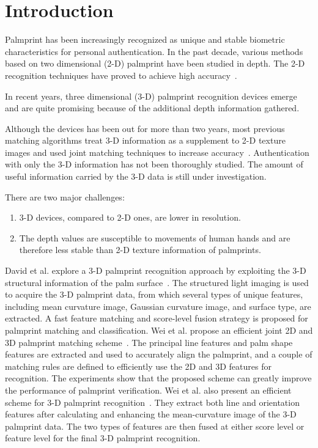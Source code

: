 
\chapter{Introduction\label{ch:intro}}

Palmprint has been increasingly recognized as unique and stable biometric characteristics for personal authentication. In the past decade, various methods based on two dimensional (2-D) palmprint have been studied in depth. The 2-D recognition techniques have proved to achieve high accuracy~\cite{Kong:2009hj}.

In recent years, three dimensional (3-D) palmprint recognition devices emerge and are quite promising because of the additional depth information gathered.

Although the devices has been out for more than two years, most previous matching algorithms treat 3-D information as a supplement to 2-D texture images and used joint matching techniques to increase accuracy~\cite{Li:2011ur, Li:2010en, Zhang:2009dp, Zhang:2008kc, Zhang:2010uu}. Authentication with only the 3-D information has not been thoroughly studied. The amount of useful information carried by the 3-D data is still under investigation.

There are two major challenges:

\begin{enumerate}
	\item 3-D devices, compared to 2-D ones, are lower in resolution.
	\item The depth values are susceptible to movements of human hands and are therefore less stable than 2-D texture information of palmprints.
\end{enumerate}

David et al. explore a 3-D palmprint recognition approach by exploiting the 3-D structural information of the palm surface~\cite{Zhang:2009dp, Zhang:2008kc}. The structured light imaging is used to acquire the 3-D palmprint data, from which several types of unique features, including mean curvature image, Gaussian curvature image, and surface type, are extracted. A fast feature matching and score-level fusion strategy is proposed for palmprint matching and classification. Wei et al. propose an efficient joint 2D and 3D palmprint matching scheme~\cite{Li:2010en}. The principal line features and palm shape features are extracted and used to accurately align the palmprint, and a couple of matching rules are defined to efficiently use the 2D and 3D features for recognition. The experiments show that the proposed scheme can greatly improve the performance of palmprint verification. Wei et al. also present an efficient scheme for 3-D palmprint recognition~\cite{Li:2011ur}. They extract both line and orientation features after calculating and enhancing the mean-curvature image of the 3-D palmprint data. The two types of features are then fused at either score level or feature level for the final 3-D palmprint recognition.

